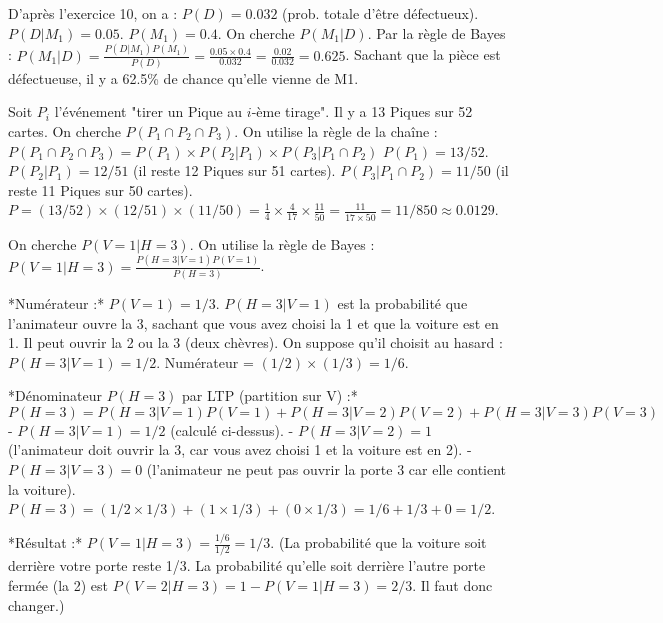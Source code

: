 \begin{correctionbox}
D'après l'exercice 10, on a :
$P(D) = 0.032$ (prob. totale d'être défectueux).
$P(D|M_1) = 0.05$.
$P(M_1) = 0.4$.
On cherche $P(M_1|D)$. Par la règle de Bayes :
$P(M_1|D) = \frac{P(D|M_1)P(M_1)}{P(D)} = \frac{0.05 \times 0.4}{0.032} = \frac{0.02}{0.032} = 0.625$.
Sachant que la pièce est défectueuse, il y a 62.5\% de chance qu'elle vienne de M1.
\end{correctionbox}


\begin{correctionbox}
Soit $P_i$ l'événement "tirer un Pique au $i$-ème tirage". Il y a 13 Piques sur 52 cartes.
On cherche $P(P_1 \cap P_2 \cap P_3)$. On utilise la règle de la chaîne :
$P(P_1 \cap P_2 \cap P_3) = P(P_1) \times P(P_2|P_1) \times P(P_3|P_1 \cap P_2)$
$P(P_1) = 13/52$.
$P(P_2|P_1) = 12/51$ (il reste 12 Piques sur 51 cartes).
$P(P_3|P_1 \cap P_2) = 11/50$ (il reste 11 Piques sur 50 cartes).
$P = (13/52) \times (12/51) \times (11/50) = \frac{1}{4} \times \frac{4}{17} \times \frac{11}{50} = \frac{11}{17 \times 50} = 11/850 \approx 0.0129$.
\end{correctionbox}

\begin{correctionbox}
On cherche $P(V=1 | H=3)$. On utilise la règle de Bayes :
$P(V=1 | H=3) = \frac{P(H=3 | V=1) P(V=1)}{P(H=3)}$.

*Numérateur :* $P(V=1) = 1/3$. $P(H=3 | V=1)$ est la probabilité que l'animateur ouvre la 3, sachant que vous avez choisi la 1 et que la voiture est en 1. Il peut ouvrir la 2 ou la 3 (deux chèvres). On suppose qu'il choisit au hasard : $P(H=3 | V=1) = 1/2$.
Numérateur = $(1/2) \times (1/3) = 1/6$.

*Dénominateur $P(H=3)$ par LTP (partition sur V) :*
$P(H=3) = P(H=3|V=1)P(V=1) + P(H=3|V=2)P(V=2) + P(H=3|V=3)P(V=3)$
- $P(H=3|V=1) = 1/2$ (calculé ci-dessus).
- $P(H=3|V=2) = 1$ (l'animateur doit ouvrir la 3, car vous avez choisi 1 et la voiture est en 2).
- $P(H=3|V=3) = 0$ (l'animateur ne peut pas ouvrir la porte 3 car elle contient la voiture).
$P(H=3) = (1/2 \times 1/3) + (1 \times 1/3) + (0 \times 1/3) = 1/6 + 1/3 + 0 = 1/2$.

*Résultat :* $P(V=1 | H=3) = \frac{1/6}{1/2} = 1/3$.
(La probabilité que la voiture soit derrière votre porte reste 1/3. La probabilité qu'elle soit derrière l'autre porte fermée (la 2) est $P(V=2|H=3) = 1 - P(V=1|H=3) = 2/3$. Il faut donc changer.)
\end{correctionbox}

